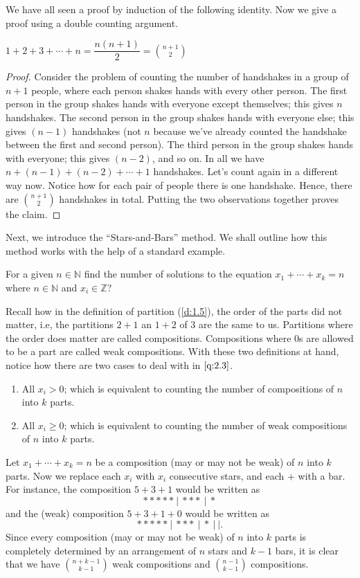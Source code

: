 We have all seen a proof by induction of the following identity. Now we give a proof using a double counting argument.
\begin{claim}
	$1+2+3+\cdots+n=\dfrac{n\left( n+1 \right)}{2}=\binom{n+1}{2}$
	\label{c:2.2}
\end{claim}
\begin{proof}
Consider the problem of counting the number of handshakes in a group of $n+1$ people, where each person shakes hands with every other person. The first person in the group shakes hands with everyone except themselves; this gives $n$ handshakes. The second person in the group shakes hands with everyone else; this gives $\left( n-1 \right)$ handshakes (not $n$ because we've already counted the handshake between the first and second person). The third person in the group shakes hands with everyone; this gives $\left( n-2 \right)$, and so on. In all we have $n+\left( n-1 \right)+\left( n-2 \right)+\cdots+1$ handshakes. Let's count again in a different way now. Notice how for each pair of people there is one handshake. Hence, there are $\binom{n+1}{2}$ handshakes in total. Putting the two observations together proves the claim.
\end{proof}
Next, we introduce the ``Stars-and-Bars'' method. We shall outline how this method works with the help of a standard example.
\begin{question}
For a given $n\in \mathbb{N}$ find the number of solutions to the equation  $x_{1}+\cdots+x_{k}=n$ where $n\in\mathbb{N}$ and  $x_{i}\in\mathbb{Z}$?
\label{q:2.3}
\end{question}
\begin{solution}
Recall how in the definition of partition (\cref{d:1.5}), the order of the parts did not matter, i.e, the partitions $2+1$ an $1+2$ of $3$ are the same to us. Partitions where the order does matter are called compositions. Compositions where $0$s are allowed to be a part are called weak compositions. With these two definitions at hand, notice how there are two cases to deal with in $\cref{q:2.3}$.
\begin{enumerate}
    \item All $x_{i}>0$; which is equivalent to counting the number of compositions of $n$ into $k$ parts.
    \item All $x_{i}\geq 0$; which is equivalent to counting the number of weak compositions of $n$ into $k$ parts.
\end{enumerate}
Let $x_1+\cdots+x_k=n$ be a composition (may or may not be weak) of $n$ into $k$ parts. Now we replace each $x_i$ with $x_i$ consecutive stars, and each $+$ with a bar. For instance, the composition $5+3+1$ would be written as \[
***** \ | \ *** \ | \ *
\] and the (weak) composition $5+3+1+0$ would be written as 
\[
***** \ | \ *** \ | \ * \ | \ |.
\]
Since every composition (may or may not be weak) of $n$ into $k$ parts is completely determined by an arrangement of $n$ stars and $k-1$ bars, it is clear that we have $\binom{n+k-1}{k-1}$ weak compositions and $\binom{n-1}{k-1}$ compositions.
\end{solution}
